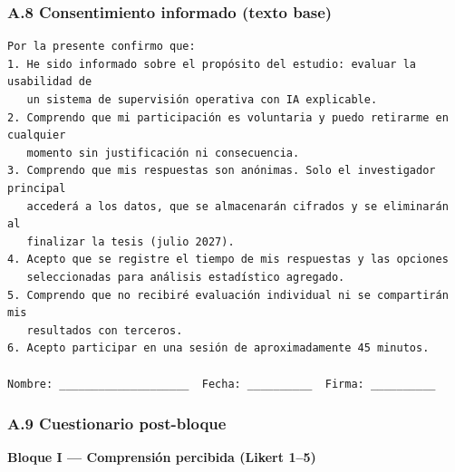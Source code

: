 \subsubsection{A.8 Consentimiento informado (texto
base)}\label{a.8-consentimiento-informado-texto-base}

\begin{verbatim}
Por la presente confirmo que:
1. He sido informado sobre el propósito del estudio: evaluar la usabilidad de
   un sistema de supervisión operativa con IA explicable.
2. Comprendo que mi participación es voluntaria y puedo retirarme en cualquier
   momento sin justificación ni consecuencia.
3. Comprendo que mis respuestas son anónimas. Solo el investigador principal
   accederá a los datos, que se almacenarán cifrados y se eliminarán al
   finalizar la tesis (julio 2027).
4. Acepto que se registre el tiempo de mis respuestas y las opciones
   seleccionadas para análisis estadístico agregado.
5. Comprendo que no recibiré evaluación individual ni se compartirán mis
   resultados con terceros.
6. Acepto participar en una sesión de aproximadamente 45 minutos.

Nombre: ____________________  Fecha: __________  Firma: __________
\end{verbatim}

\subsubsection{A.9 Cuestionario
post-bloque}\label{a.9-cuestionario-post-bloque}

\textbf{Bloque I --- Comprensión percibida (Likert 1--5)}


